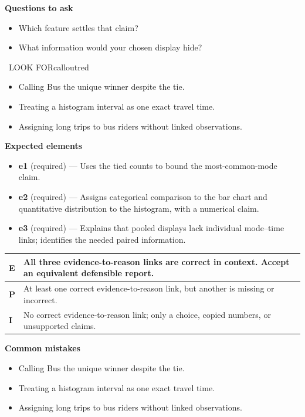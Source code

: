 \documentclass[11pt]{article}
\begin{document}
\textbf{Questions to ask}
\begin{itemize}[leftmargin=1.5em,itemsep=2pt,topsep=2pt]
  \item Which feature settles that claim?
  \item What information would your chosen display hide?
\end{itemize}

\begin{callout}{\IconWarn\ LOOK FOR}{calloutred}
\begin{itemize}[leftmargin=1.5em,itemsep=2pt,topsep=2pt]
  \item Calling Bus the unique winner despite the tie.
  \item Treating a histogram interval as one exact travel time.
  \item Assigning long trips to bus riders without linked observations.
\end{itemize}
\end{callout}


\textbf{Expected elements}
\begin{itemize}[leftmargin=1.5em,itemsep=2pt,topsep=2pt]
  \item \textbf{e1} (required) --- Uses the tied counts to bound the most-common-mode claim.
  \item \textbf{e2} (required) --- Assigns categorical comparison to the bar chart and quantitative distribution to the histogram, with a numerical claim.
  \item \textbf{e3} (required) --- Explains that pooled displays lack individual mode--time links; identifies the needed paired information.
\end{itemize}

{\small\renewcommand{\arraystretch}{1.25}
\noindent\begin{tabular}{|p{0.5in}|p{5.9in}|}
\hline
\textbf{E} & All three evidence-to-reason links are correct in context. Accept an equivalent defensible report. \\ \hline
\textbf{P} & At least one correct evidence-to-reason link, but another is missing or incorrect. \\ \hline
\textbf{I} & No correct evidence-to-reason link; only a choice, copied numbers, or unsupported claims. \\ \hline
\end{tabular}}

\textbf{Common mistakes}
\begin{itemize}[leftmargin=1.5em,itemsep=2pt,topsep=2pt]
  \item Calling Bus the unique winner despite the tie.
  \item Treating a histogram interval as one exact travel time.
  \item Assigning long trips to bus riders without linked observations.
\end{itemize}
\end{document}
